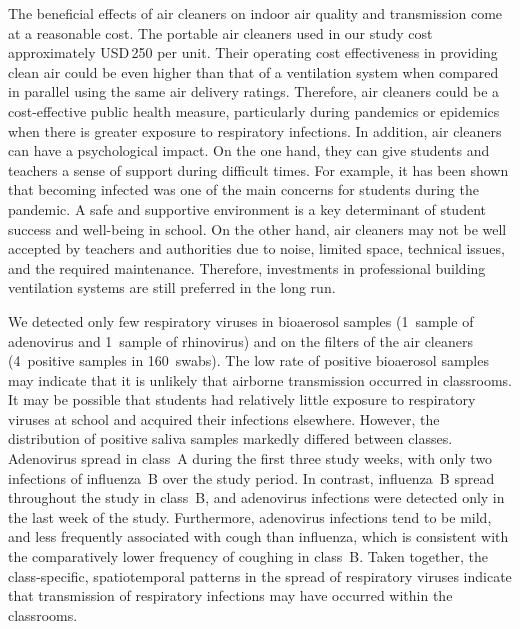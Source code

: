 \documentclass[fleqn,11pt]{wlscirep}
\begin{document}
The beneficial effects of air cleaners on indoor air quality and transmission come at a reasonable cost. The portable air cleaners used in our study cost approximately USD\,250 per unit. Their operating cost effectiveness in providing clean air could be even higher than that of a ventilation system when compared in parallel using the same air delivery ratings.\cite{Noh2016EnBuild} Therefore, air cleaners could be a cost-effective public health measure, particularly during pandemics or epidemics when there is greater exposure to respiratory infections. In addition, air cleaners can have a psychological impact. On the one hand, they can give students and teachers a sense of support during difficult times. For example, it has been shown that becoming infected was one of the main concerns for students during the pandemic.\cite{Yuerekli2022IJERPH} A safe and supportive environment is a key determinant of student success and well-being in school.\cite{Kutsyuruba2015RevEduc} On the other hand, air cleaners may not be well accepted by teachers and authorities due to noise, limited space, technical issues, and the required maintenance.\cite{Sanguinetti2022IndoorAir} Therefore, investments in professional building ventilation systems are still preferred in the long run.\cite{Nardell2016}


We detected only few respiratory viruses in bioaerosol samples (1~sample of adenovirus and 1~sample of rhinovirus) and on the filters of the air cleaners (4~positive samples in 160~swabs). The low rate of positive bioaerosol samples may indicate that it is unlikely that airborne transmission occurred in classrooms. It may be possible that students had relatively little exposure to respiratory viruses at school and acquired their infections elsewhere. However, the distribution of positive saliva samples markedly differed between classes. Adenovirus spread in class~A during the first three study weeks, with only two infections of influenza~B over the study period. In contrast, influenza~B spread throughout the study in class~B, and adenovirus infections were detected only in the last week of the study. Furthermore, adenovirus infections tend to be mild,\cite{Kunz2010CIDR} and less frequently associated with cough than influenza,\cite{Ma2018RMV} which is consistent with the comparatively lower frequency of coughing in class~B. Taken together, the class-specific, spatiotemporal patterns in the spread of respiratory viruses indicate that transmission of respiratory infections may have occurred within the classrooms. 
\end{document}
